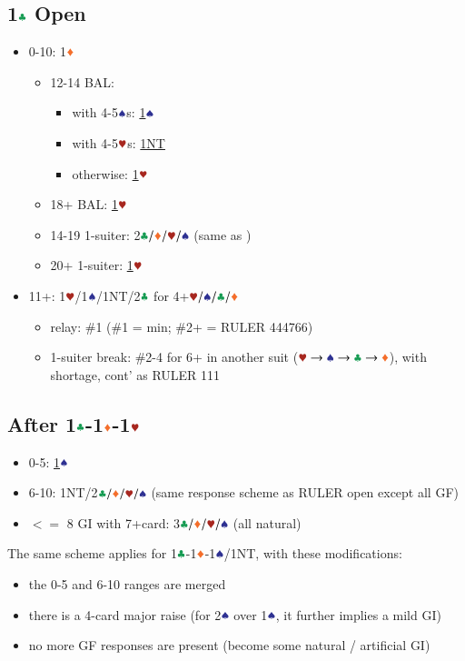 \documentclass{article}
\begin{document}
\begin{multicols}{2}
\section{1$\ccc$ Open}\label{sec:1c}
\begin{itemize}
    \item 0-10: 1$\ddd$
    \begin{itemize}
        \item 12-14 BAL:
        \begin{itemize}
            \item with 4-5$\sss$s: \hyperref[sec:1c1d1h]{1$\sss$}
            \item with 4-5$\hhh$s: \hyperref[sec:1c1d1h]{1NT}
            \item otherwise: \hyperref[sec:1c1d1h]{1$\hhh$}
        \end{itemize}
        \item 18+ BAL: \hyperref[sec:1c1d1h]{1$\hhh$}
        \item 14-19 1-suiter: 2$\ccc/\ddd/\hhh/\sss$ (same as )
        \item 20+ 1-suiter: \hyperref[sec:1c1d1h]{1$\hhh$}
    \end{itemize}
    \item 11+: 1$\hhh$/1$\sss$/1NT/2$\ccc$ 
    for 4+$\hhh/\sss/\ccc/\ddd$
    \begin{itemize}
        \item relay: \#1 (\#1 = min; \#2+ = RULER 444766)
        \item 1-suiter break: \#2-4 for 6+ in another suit ($\hscd$), with shortage, cont' as RULER 111
    \end{itemize}
\end{itemize}

\subsection{After 1$\ccc$-1$\ddd$-1$\hhh$}\label{sec:1c1d1h}
\begin{itemize}
    \item 0-5: \hyperref[sec:1c1d1h1s]{1$\sss$}
    \item 6-10: 1NT/2$\ccc/\ddd/\hhh/\sss$
        (same response scheme as RULER open except all GF)
    \item $<=$ 8 GI with 7+card: 3$\ccc/\ddd/\hhh/\sss$ (all natural)
\end{itemize}

\noindent The same scheme applies for 1$\ccc$-1$\ddd$-1$\sss$/1NT, with these modifications:
\begin{itemize}
    \item the 0-5 and 6-10 ranges are merged
    \item there is a 4-card major raise (for 2$\sss$ over 1$\sss$, it further implies a mild GI)
    \item no more GF responses are present (become some natural / artificial GI)
\end{itemize}


\end{multicols}
\end{document}
